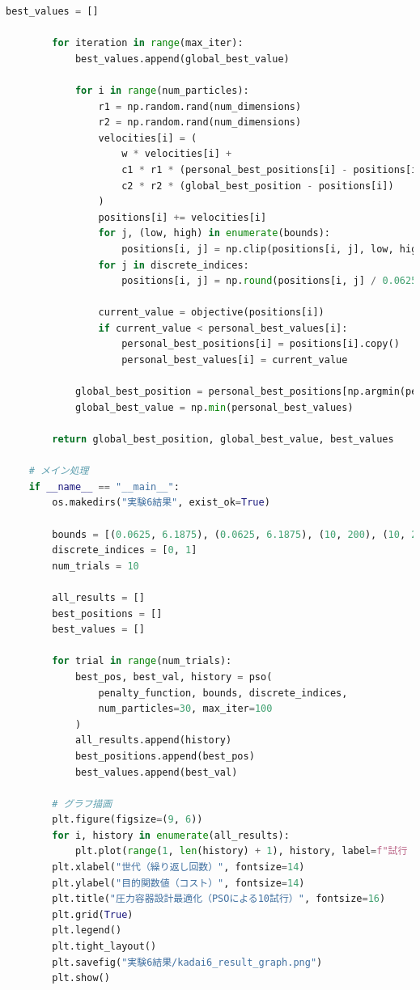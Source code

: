 \begin{lstlisting}[language=Python, caption=PSOによる圧力容器設計の最適化コード抜粋, label=lst:kadai6_code]
        best_values = []
    
        for iteration in range(max_iter):
            best_values.append(global_best_value)
    
            for i in range(num_particles):
                r1 = np.random.rand(num_dimensions)
                r2 = np.random.rand(num_dimensions)
                velocities[i] = (
                    w * velocities[i] +
                    c1 * r1 * (personal_best_positions[i] - positions[i]) +
                    c2 * r2 * (global_best_position - positions[i])
                )
                positions[i] += velocities[i]
                for j, (low, high) in enumerate(bounds):
                    positions[i, j] = np.clip(positions[i, j], low, high)
                for j in discrete_indices:
                    positions[i, j] = np.round(positions[i, j] / 0.0625) * 0.0625
    
                current_value = objective(positions[i])
                if current_value < personal_best_values[i]:
                    personal_best_positions[i] = positions[i].copy()
                    personal_best_values[i] = current_value
    
            global_best_position = personal_best_positions[np.argmin(personal_best_values)]
            global_best_value = np.min(personal_best_values)
    
        return global_best_position, global_best_value, best_values
    
    # メイン処理
    if __name__ == "__main__":
        os.makedirs("実験6結果", exist_ok=True)
    
        bounds = [(0.0625, 6.1875), (0.0625, 6.1875), (10, 200), (10, 200)]
        discrete_indices = [0, 1]
        num_trials = 10
    
        all_results = []
        best_positions = []
        best_values = []
    
        for trial in range(num_trials):
            best_pos, best_val, history = pso(
                penalty_function, bounds, discrete_indices,
                num_particles=30, max_iter=100
            )
            all_results.append(history)
            best_positions.append(best_pos)
            best_values.append(best_val)
    
        # グラフ描画
        plt.figure(figsize=(9, 6))
        for i, history in enumerate(all_results):
            plt.plot(range(1, len(history) + 1), history, label=f"試行 {i+1}")
        plt.xlabel("世代（繰り返し回数）", fontsize=14)
        plt.ylabel("目的関数値（コスト）", fontsize=14)
        plt.title("圧力容器設計最適化（PSOによる10試行）", fontsize=16)
        plt.grid(True)
        plt.legend()
        plt.tight_layout()
        plt.savefig("実験6結果/kadai6_result_graph.png")
        plt.show()
    

\end{lstlisting}
